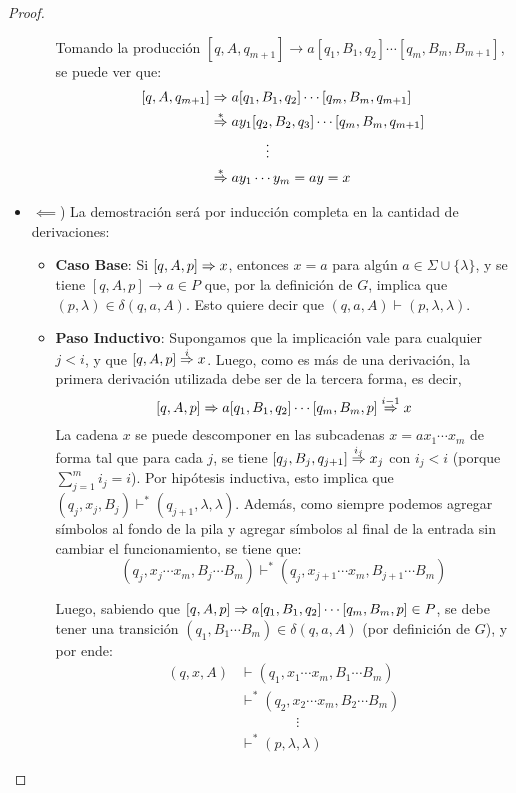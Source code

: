 \begin{proof}
\begin{itemize}
\begin{itemize}
            Tomando la producción $[q, A, q_{m + 1}] \to a [q_1, B_1, q_2] \cdots [q_m, B_m, B_{m + 1}]$, se puede ver que:
            $$
            \begin{aligned}\relax
                [q, A, q_{m + 1}] & \Rightarrow a [q_1, B_1, q_2] \cdots [q_m, B_m, q_{m + 1}] \\
                & \overset{*}{\Rightarrow} a y_1 [q_2, B_2, q_3] \cdots [q_m, B_m, q_{m + 1}] \\
                & \qquad \qquad \vdots \\
                & \overset{*}{\Rightarrow} a y_1 \cdots y_m = a y = x
            \end{aligned}
            $$
        \end{itemize}
        \item $\impliedby$) La demostración será por inducción completa en la cantidad de derivaciones:
        \begin{itemize}
            \item \textbf{Caso Base}: Si $[q, A, p] \Rightarrow x$, entonces $x = a$ para algún $a \in \Sigma \cup \{\lambda\}$, y se tiene $[q, A, p] \to a \in P$ que, por la definición de $G$, implica que $(p, \lambda) \in \delta(q, a, A)$. Esto quiere decir que $(q, a, A) \vdash (p, \lambda, \lambda)$.
            \item \textbf{Paso Inductivo}: Supongamos que la implicación vale para cualquier $j < i$, y que $[q, A, p] \overset{i}{\Rightarrow} x$. Luego, como es más de una derivación, la primera derivación utilizada debe ser de la tercera forma, es decir,
            $$
                [q, A, p] \Rightarrow a [q_1, B_1, q_2] \cdots [q_m, B_m, p] \overset{i - 1}{\Rightarrow} x
            $$
            La cadena $x$ se puede descomponer en las subcadenas $x = a x_1 \cdots x_m$ de forma tal que para cada $j$, se tiene $[q_j, B_j, q_{j + 1}] \overset{i_j}{\Rightarrow} x_j$ con $i_j < i$ (porque $\sum_{j = 1}^m i_j = i$). Por hipótesis inductiva, esto implica que $(q_j, x_j, B_j) \vdash^* (q_{j + 1}, \lambda, \lambda)$. Además, como siempre podemos agregar símbolos al fondo de la pila y agregar símbolos al final de la entrada sin cambiar el funcionamiento, se tiene que:
            $$
                (q_j, x_j \cdots x_m, B_j \cdots B_m) \vdash^* (q_j, x_{j + 1} \cdots x_m, B_{j + 1} \cdots B_m)
            $$

            Luego, sabiendo que $[q, A, p] \Rightarrow a [q_1, B_1, q_2] \cdots [q_m, B_m, p] \in P$, se debe tener una transición $(q_1, B_1 \cdots B_m) \in \delta(q, a, A)$ (por definición de $G$), y por ende:
            $$
                \begin{aligned}
                    (q, x, A) & \vdash (q_1, x_1 \cdots x_m, B_1 \cdots B_m) \\
                    & \vdash^* (q_2, x_2 \cdots x_m, B_2 \cdots B_m) \\
                    & \qquad \qquad \vdots \\
                    & \vdash^* (p, \lambda, \lambda)
                \end{aligned}
            $$
        \end{itemize}
    \end{itemize}


\end{proof}
